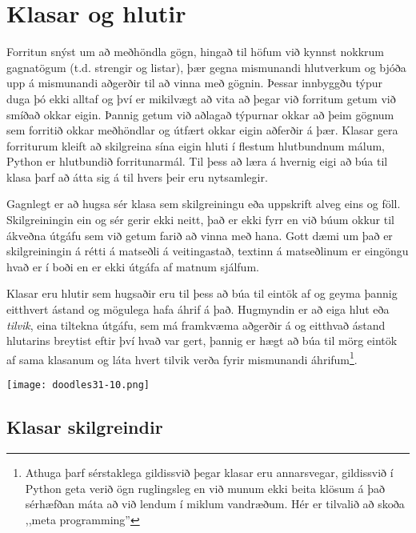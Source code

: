 
\chapter{Klasar og hlutir}\label{k:klasar}
Forritun snýst um að meðhöndla gögn, hingað til höfum við kynnst nokkrum gagnatögum (t.d. strengir og listar), þær gegna mismunandi hlutverkum og bjóða upp á mismunandi aðgerðir til að vinna með gögnin.
Þessar innbyggðu týpur duga þó ekki alltaf og því er mikilvægt að vita að þegar við forritum getum við smíðað okkar eigin.
Þannig getum við aðlagað týpurnar okkar að þeim gögnum sem forritið okkar meðhöndlar og útfært okkar eigin aðferðir á þær.
Klasar gera forriturum kleift að skilgreina sína eigin hluti í flestum hlutbundnum málum, Python er hlutbundið forritunarmál.
Til þess að læra á hvernig eigi að búa til klasa þarf að átta sig á til hvers þeir eru nytsamlegir.

Gagnlegt er að hugsa sér klasa sem skilgreiningu eða uppskrift alveg eins og föll.
Skilgreiningin ein og sér gerir ekki neitt, það er ekki fyrr en við búum okkur til ákveðna útgáfu sem við getum farið að vinna með hana.
Gott dæmi um það er skilgreiningin á rétti á matseðli á veitingastað, textinn á matseðlinum er eingöngu hvað er í boði en er ekki útgáfa af matnum sjálfum.

Klasar eru hlutir sem hugsaðir eru til þess að búa til eintök af og geyma þannig eitthvert ástand og mögulega hafa áhrif á það.
Hugmyndin er að eiga hlut eða \emph{tilvik}, eina tiltekna útgáfu, sem má framkvæma aðgerðir á og eitthvað ástand hlutarins breytist eftir því hvað var gert, þannig er hægt að búa til mörg eintök af sama klasanum og láta hvert tilvik verða fyrir mismunandi áhrifum\footnote{Athuga þarf sérstaklega gildissvið þegar klasar eru annarsvegar, gildissvið í Python geta verið ögn ruglingsleg en við munum ekki beita klösum á það sérhæfðan máta að við lendum í miklum vandræðum.
Hér er tilvalið að skoða ,,meta programming''}.


\phantom{easter egg}
\begin{center}
	\texttt{[image: doodles31-10.png]}
\end{center}
\section{Klasar skilgreindir}\label{uk:klasar-skilgreindir}

